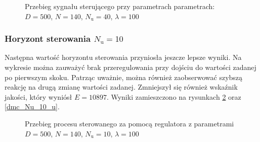 \begin{figure}[b]
    \centering
    \caption{Przebieg sygnału sterującego przy parametrach parametrach: $D = 500$, $N = 140$, $N_{\mathrm{u}} = 40$, $\lambda = 100$}
    \label{dmc_Nu_40_u}
\end{figure}

\subsubsection{Horyzont sterowania $N_{\mathrm{u}} = 10$}
Następna wartość horyzontu sterowania przyniosła jeszcze lepsze wyniki. Na wykresie można zauważyć brak przeregulowania przy dojściu do wartości zadanej po pierwszym skoku. Patrząc uważnie, można również zaobserwować szybszą reakcję na drugą zmianę wartości zadanej. Zmniejszył się również wskaźnik jakości, który wyniósł $E = \num{10897}$. Wyniki zamieszczono na rysunkach \ref{dmc_Nu_10_y} oraz \ref{dmc_Nu_10_u}.

\begin{figure}[t]
    \centering
    \caption{Przebieg procesu sterowanego za pomocą regulatora z parametrami $D = 500$, $N = 140$, $N_{\mathrm{u}} = 10$, $\lambda = 100$}
    \label{dmc_Nu_10_y}
\end{figure}


